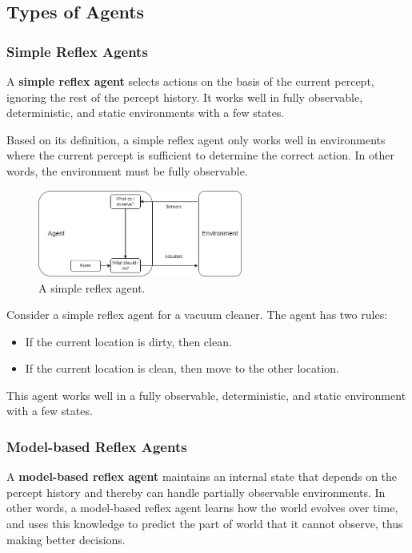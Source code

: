 \documentclass[a4paper,12pt]{article}
\begin{document}
\subsection{Types of Agents}

\subsubsection{Simple Reflex Agents}

A \textbf{simple reflex agent} selects actions on the basis of the current percept, ignoring the rest of the percept history. It works well in fully observable, deterministic, and static environments with a few states.

Based on its definition, a simple reflex agent only works well in environments where the current percept is sufficient to determine the correct action. In other words, the environment must be fully observable.

\begin{figure}[H]
  \centering
  \includegraphics[width=0.6\textwidth]{figure/simple reflex.drawio.png}
  \caption{A simple reflex agent.}
\end{figure}

\begin{examplebox}
  Consider a simple reflex agent for a vacuum cleaner. The agent has two rules:
  \begin{itemize}
    \item If the current location is dirty, then clean.
    \item If the current location is clean, then move to the other location.
  \end{itemize}
  This agent works well in a fully observable, deterministic, and static environment with a few states.
\end{examplebox}

\subsubsection{Model-based Reflex Agents}

A \textbf{model-based reflex agent} maintains an internal state that depends on the percept history and thereby can handle partially observable environments. In other words, a model-based reflex agent learns how the world evolves over time, and uses this knowledge to predict the part of world that it cannot observe, thus making better decisions.
\end{document}

